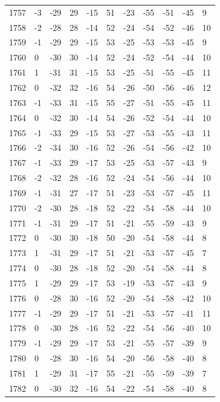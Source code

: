 \begin{table}[H]
\begin{tabular}{lllllllllll}
1757 & -3 & -29 & 29 & -15 & 51 & -23 & -55 & -51 & -45 & 9 \\
1758 & -2 & -28 & 28 & -14 & 52 & -24 & -54 & -52 & -46 & 10 \\
1759 & -1 & -29 & 29 & -15 & 53 & -25 & -53 & -53 & -45 & 9 \\
1760 & 0 & -30 & 30 & -14 & 52 & -24 & -52 & -54 & -44 & 10 \\
1761 & 1 & -31 & 31 & -15 & 53 & -25 & -51 & -55 & -45 & 11 \\
1762 & 0 & -32 & 32 & -16 & 54 & -26 & -50 & -56 & -46 & 12 \\
1763 & -1 & -33 & 31 & -15 & 55 & -27 & -51 & -55 & -45 & 11 \\
1764 & 0 & -32 & 30 & -14 & 54 & -26 & -52 & -54 & -44 & 10 \\
1765 & -1 & -33 & 29 & -15 & 53 & -27 & -53 & -55 & -43 & 11 \\
1766 & -2 & -34 & 30 & -16 & 52 & -26 & -54 & -56 & -42 & 10 \\
1767 & -1 & -33 & 29 & -17 & 53 & -25 & -53 & -57 & -43 & 9 \\
1768 & -2 & -32 & 28 & -16 & 52 & -24 & -54 & -56 & -44 & 10 \\
1769 & -1 & -31 & 27 & -17 & 51 & -23 & -53 & -57 & -45 & 11 \\
1770 & -2 & -30 & 28 & -18 & 52 & -22 & -54 & -58 & -44 & 10 \\
1771 & -1 & -31 & 29 & -17 & 51 & -21 & -55 & -59 & -43 & 9 \\
1772 & 0 & -30 & 30 & -18 & 50 & -20 & -54 & -58 & -44 & 8 \\
1773 & 1 & -31 & 29 & -17 & 51 & -21 & -53 & -57 & -45 & 7 \\
1774 & 0 & -30 & 28 & -18 & 52 & -20 & -54 & -58 & -44 & 8 \\
1775 & 1 & -29 & 29 & -17 & 53 & -19 & -53 & -57 & -43 & 9 \\
1776 & 0 & -28 & 30 & -16 & 52 & -20 & -54 & -58 & -42 & 10 \\
1777 & -1 & -29 & 29 & -17 & 51 & -21 & -53 & -57 & -41 & 11 \\
1778 & 0 & -30 & 28 & -16 & 52 & -22 & -54 & -56 & -40 & 10 \\
1779 & -1 & -29 & 29 & -17 & 53 & -21 & -55 & -57 & -39 & 9 \\
1780 & 0 & -28 & 30 & -16 & 54 & -20 & -56 & -58 & -40 & 8 \\
1781 & 1 & -29 & 31 & -17 & 55 & -21 & -55 & -59 & -39 & 7 \\
1782 & 0 & -30 & 32 & -16 & 54 & -22 & -54 & -58 & -40 & 8 \\

\end{tabular}
\end{table}
